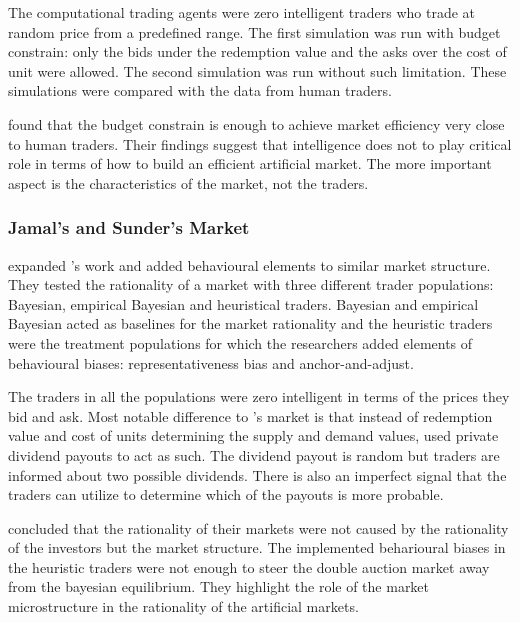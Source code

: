 The computational trading agents were zero intelligent traders 
who trade at random price from a predefined range. 
The first simulation was run with budget constrain: only the bids
under the redemption value and the asks over the cost of unit 
were allowed. The second simulation was run without such limitation.
These simulations were compared with the data from human traders.

\citeauthor{God93} found that the budget constrain is enough to 
achieve market efficiency very close to human traders. Their findings
suggest that intelligence does not to play critical role in terms of 
how to build an efficient artificial market. The more important aspect
is the characteristics of the market, not the traders.

\subsubsection{Jamal's and Sunder's Market}
\citet{Jam96} expanded \citeauthor{God93}'s work and added behavioural 
elements to similar market structure. They tested the rationality of
a market with three different trader populations: Bayesian, empirical
Bayesian and heuristical traders. Bayesian and empirical Bayesian acted
as baselines for the market rationality and the heuristic traders were
the treatment populations for which the researchers added elements of behavioural
biases: representativeness bias and anchor-and-adjust. 

The traders in all the populations were zero intelligent in terms of the
prices they bid and ask. Most notable difference to \citet{God93}'s market
is that instead of redemption value and cost of units determining the
supply and demand values, \citeauthor{Jam96} used private dividend payouts 
to act as such. The dividend payout is random but traders are informed
about two possible dividends. There is also an imperfect signal that the
traders can utilize to determine which of the payouts is more probable. 

\citeauthor{Jam96} concluded that the rationality of their markets were
not caused by the rationality of the investors but the market structure.
The implemented beharioural biases in the heuristic traders were not enough 
to steer the double auction market away from the bayesian equilibrium.
They highlight the role of the market microstructure in the rationality 
of the artificial markets. 


